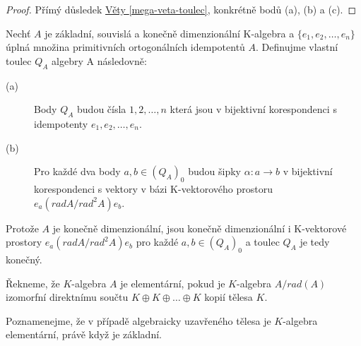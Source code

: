     \begin{proof}
      Přímý důsledek \hyperref[mega-veta-toulec]{Věty \ref*{mega-veta-toulec}}, konkrétně bodů (a), (b) a (c).
    \end{proof}
    
    \begin{dfn}
      Nechť $A$ je základní, souvislá a konečně dimenzionální K-algebra a $\{e_1,e_2,\ldots,e_n\}$ 
      úplná množina primitivních ortogonálních idempotentů $A$. Definujme vlastní 
      toulec $Q_A$ algebry A následovně:
      \begin{description}
        \item[(a)] Body $Q_A$ budou čísla $1,2,\ldots,n$ která jsou v 
        bijektivní korespondenci s idempotenty $e_1,e_2,\ldots,e_n$.
        \item[(b)] Pro každé dva body $a,b\in (Q_A)_0$ budou šipky $\alpha:a\rightarrow b$ 
        v bijektivní korespondenci s vektory v bázi K-vektorového prostoru $e_a(radA/rad^2A)e_b$.
      \end{description}
    \end{dfn}
    
    \begin{pzn}      
      Protože $A$ je konečně dimenzionální, jsou konečně dimenzionální i 
      K-vektorové prostory $e_a(radA/rad^2A)e_b$ pro každé $a,b\in(Q_A)_0$ 
      a toulec $Q_A$ je tedy konečný.    
     \end{pzn}    
     
    \begin{dfn}
      Řekneme, že $K$-algebra $A$ je elementární, pokud je 
      $K$-algebra $A/rad(A)$ izomorfní direktnímu součtu $K\oplus K\oplus\ldots\oplus K$ 
      kopií tělesa $K$.
    \end{dfn}
    
    \begin{pzn}
      Poznamenejme, že v případě algebraicky uzavřeného tělesa je $K$-algebra 
      elementární, právě když je základní.
    \end{pzn}
      
